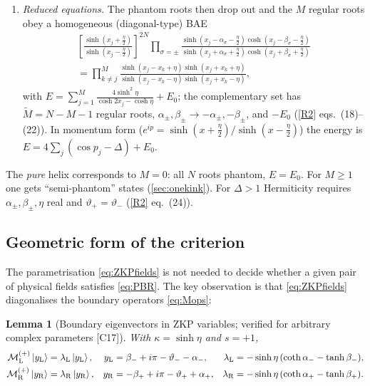 \documentclass[11pt,a4paper]{article}
\newtheorem{lemma}[theorem]{Lemma}
\theoremstyle{definition}
\newcommand{\ML}[1][s]{\mathcal M_{\mathrm L}^{(#1)}}
\newcommand{\MR}[1][s]{\mathcal M_{\mathrm R}^{(#1)}}
\newcommand{\ver}[1]{\textsf{[#1]}}   %
\begin{document}
\begin{enumerate}[label=\arabic*.]
\item \emph{Reduced equations.} The phantom roots then drop out and the $M$ regular roots obey a homogeneous (diagonal-type) BAE
\begin{multline}\label{eq:BAEreduced}
\left[\frac{\sinh(x_j+\frac\eta2)}{\sinh(x_j-\frac\eta2)}\right]^{2N}\prod_{\sigma=\pm}\frac{\sinh(x_j-\alpha_\sigma-\frac\eta2)\cosh(x_j-\beta_\sigma-\frac\eta2)}{\sinh(x_j+\alpha_\sigma+\frac\eta2)\cosh(x_j+\beta_\sigma+\frac\eta2)}\\=\prod_{k\neq j}^M\frac{\sinh(x_j-x_k+\eta)\sinh(x_j+x_k+\eta)}{\sinh(x_j-x_k-\eta)\sinh(x_j+x_k-\eta)},
\end{multline}
with $E=\sum_{j=1}^M\frac{4\sinh^2\eta}{\cosh2x_j-\cosh\eta}+E_0$; the complementary set has $\widetilde M=N-M-1$ regular roots, $\alpha_\pm,\beta_\pm\to-\alpha_\pm,-\beta_\pm$, and $-E_0$ (\ref{R2} eqs.~(18)--(22)). In momentum form ($e^{ip}=\sinh(x+\frac\eta2)/\sinh(x-\frac\eta2)$) the energy is $E=4\sum_j(\cos p_j-\Delta)+E_0$.
\end{enumerate}
The \emph{pure} helix corresponds to $M=0$: all $N$ roots phantom, $E=E_0$. For $M\ge1$ one gets ``semi-phantom'' states (\cref{sec:onekink}). For $\Delta>1$ Hermiticity requires $\alpha_\pm,\beta_\pm,\eta$ real and $\vartheta_+=\vartheta_-$ (\ref{R2} eq.~(24)).

\subsection{Geometric form of the criterion}\label{sec:geom}
The parametrisation \eqref{eq:ZKPfields} is not needed to decide whether a given pair of physical fields satisfies \eqref{eq:PBR}. The key observation is that \eqref{eq:ZKPfields} diagonalises the boundary operators \eqref{eq:Mops}:

\begin{lemma}[Boundary eigenvectors in ZKP variables; verified for arbitrary complex parameters \ver{C17}]\label{lem:ZKPeig}
With $\kappa=\sinh\eta$ and $s=+1$,
\begin{align}
\ML[+]\ket{y_{\rm L}}&=\lambda_{\rm L}\ket{y_{\rm L}},& y_{\rm L}&=\beta_-+i\pi-\vartheta_--\alpha_-,& \lambda_{\rm L}&=-\sinh\eta\,(\coth\alpha_--\tanh\beta_-),\\
\MR[+]\ket{y_{\rm R}}&=\lambda_{\rm R}\ket{y_{\rm R}},& y_{\rm R}&=-\beta_++i\pi-\vartheta_++\alpha_+,& \lambda_{\rm R}&=-\sinh\eta\,(\coth\alpha_+-\tanh\beta_+).
\end{align}
\end{lemma}
\end{document}
